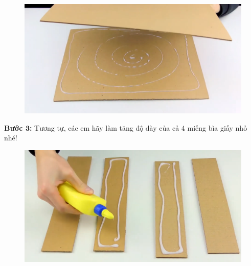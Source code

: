 \begin{multicols}{2}
\begin{figure}[H]
		\vspace*{1pt}
		\includegraphics[width=0.85\linewidth]{3}
		\vspace*{-5pt}
	\end{figure}
	\textbf{\color{toancuabi}Bước $\pmb{3}$:} Tương tự, các em hãy làm tăng độ dày của cả $4$ miếng bìa giấy nhỏ nhé!
	\begin{figure}[H]
		\vspace*{-5pt}
		\centering
		\captionsetup{labelformat= empty, justification=centering}
		\includegraphics[width= 0.8\linewidth]{4}
		

\end{figure}
\end{multicols}
